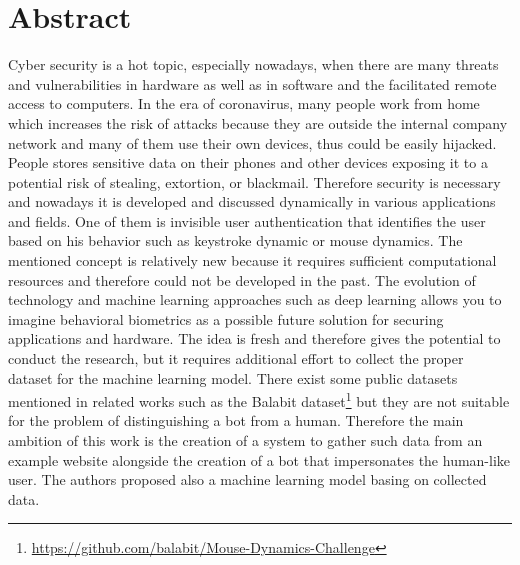 \section{Abstract}\label{sec:abstract}
Cyber security is a hot topic, especially nowadays, when there are many threats and vulnerabilities in hardware as well as in software and the facilitated remote access to computers.
In the era of coronavirus, many people work from home which increases the risk of attacks because they are outside the internal company network and many of them use their own devices, thus could be easily hijacked.
People stores sensitive data on their phones and other devices exposing it to a potential risk of stealing, extortion, or blackmail.
Therefore security is necessary and nowadays it is developed and discussed dynamically in various applications and fields.
One of them is invisible user authentication that identifies the user based on his behavior such as keystroke dynamic or mouse dynamics.
The mentioned concept is relatively new because it requires sufficient computational resources and therefore could not be developed in the past.
The evolution of technology and machine learning approaches such as deep learning allows you to imagine behavioral biometrics as a possible future solution for securing applications and hardware.
The idea is fresh and therefore gives the potential to conduct the research, but it requires additional effort to collect the proper dataset for the machine learning model.
There exist some public datasets mentioned in related works such as the Balabit dataset\footnote{\url{https://github.com/balabit/Mouse-Dynamics-Challenge}} but they are not suitable for the problem of distinguishing a bot from a human.
Therefore the main ambition of this work is the creation of a system to gather such data from an example website alongside the creation of a bot that impersonates the human-like user.
The authors proposed also a machine learning model basing on collected data.

